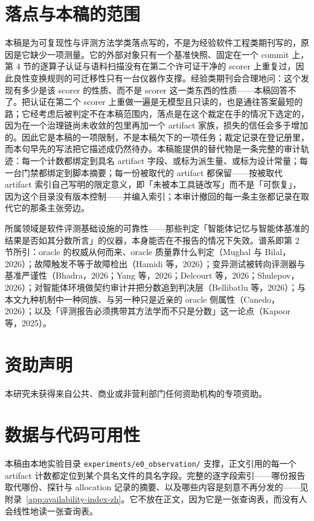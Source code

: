 \documentclass[UTF8,11pt]{ctexart}
\begin{document}
\section*{落点与本稿的范围}
本稿是为可复现性与评测方法学类落点写的，不是为经验软件工程类期刊写的，原因是它缺少一项测量。它的外部对象只有一个基准快照、固定在一个 commit 上，第 4 节的逐算子认证与语料扫描没有在第二个许可证干净的 scorer 上重复过，因此良性变换规则的可迁移性只有一台仪器作支撑。经验类期刊会合理地问：这个发现有多少是该 scorer 的性质、而不是 scorer 这一类东西的性质——本稿回答不了。把认证在第二个 scorer 上重做一遍是无模型且只读的，也是通往答案最短的路；它经考虑后被判定不在本稿范围内，落点是在这个裁定在手的情况下选定的，因为在一个治理链尚未收敛的包里再加一个 artifact 家族，损失的信任会多于增加的。因此它是本稿的一项限制，不是本稿欠下的一项任务；裁定记录在登记册里，而本句早先的写法把它描述成仍然待办。本稿能提供的替代物是一条完整的审计轨迹：每一个计数都绑定到具名 artifact 字段、或标为派生量、或标为设计常量；每一台门禁都绑定到脚本摘要；每一份被取代的 artifact 都保留——按被取代 artifact 索引自己写明的限定意义，即「未被本工具链改写」而不是「可恢复」，因为这个目录没有版本控制——并编入索引；本审计撤回的每一条主张都记录在取代它的那条主张旁边。

所属领域是软件评测基础设施的可靠性——那些判定「智能体记忆与智能体基准的结果是否如其分数所言」的仪器，本身能否在不报告的情况下失效。谱系即第 2 节所引：oracle 的权威从何而来、oracle 质量靠什么判定（Mughal 与 Bilal，2026）；故障触发不等于故障检出（Hamidi 等，2026）；变异测试被转向评测器与基准严谨性（Bhadra，2026；Yang 等，2026；Delcourt 等，2026；Shulepov，2026）；对智能体环境做契约审计并把分数追到判决层（Bellibatlu 等，2026）；与本文九种机制中一种同族、与另一种只是近亲的 oracle 侧属性（Canedo，2026）；以及「评测报告必须携带其方法学而不只是分数」这一论点（Kapoor 等，2025）。

\section*{资助声明}
本研究未获得来自公共、商业或非营利部门任何资助机构的专项资助。

\section*{数据与代码可用性}
本稿由本地实验目录 \texttt{experiments/e0\_observation/} 支撑，正文引用的每一个 artifact 计数都定位到某个具名文件的具名字段。完整的逐字段索引——哪份报告取代哪份、探针与 allocation 记录的摘要、以及哪些内容是刻意不再分发的——见附录~\ref{app:availability-index-zh}。它不放在正文，因为它是一张查询表，而没有人会线性地读一张查询表。
\end{document}
